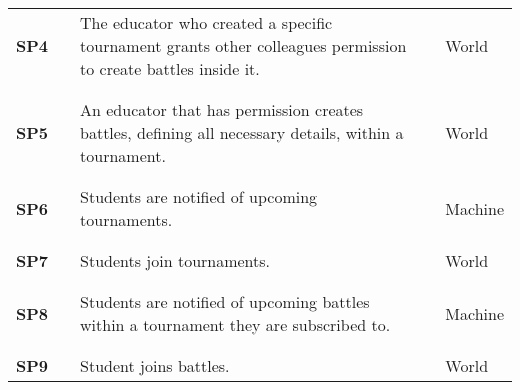 \begin{longtable}[H]{l l p{8.5cm} l l}
    \textbf{SP4}  & \vline & The educator who created a specific tournament grants other colleagues permission to create battles inside it.                 & \vline & World                  \\
                  &        &                                                                                                                                &        &                        \\\hline & & \\
    \textbf{SP5}  & \vline & An educator that has permission creates battles, defining all necessary details, within a tournament.                          & \vline & World                  \\
                  &        &                                                                                                                                &        &                        \\\hline & & \\
    \textbf{SP6}  & \vline & Students are notified of upcoming tournaments.                                                                                 & \vline & Machine                \\
                  &        &                                                                                                                                &        &                        \\\hline & & \\
    \textbf{SP7}  & \vline & Students join tournaments.                                                                                                     & \vline & World                  \\
                  &        &                                                                                                                                &        &                        \\\hline & & \\
    \textbf{SP8}  & \vline & Students are notified of upcoming battles within a tournament they are subscribed to.                                          & \vline & Machine                \\
                  &        &                                                                                                                                &        &                        \\\hline & & \\
    \textbf{SP9}  & \vline & Student joins battles.                                                                                                         & \vline & World                  \\

\end{longtable}
